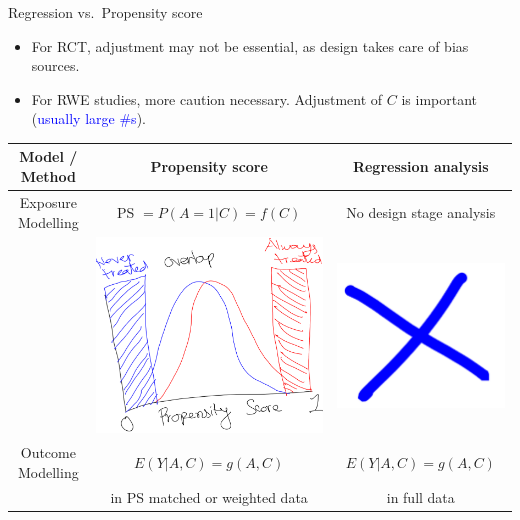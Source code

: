 \documentclass[
  ignorenonframetext,
  aspectratio=169]{beamer}
\providecommand{\tightlist}{%
  \setlength{\itemsep}{0pt}\setlength{\parskip}{0pt}}
\begin{document}
\begin{frame}{Regression vs.~Propensity score}
\protect\hypertarget{regression-vs.-propensity-score}{}
\begin{itemize}
\tightlist
\item
  For RCT, adjustment may not be essential, as design takes care of bias
  sources.
\item
  For RWE studies, more caution necessary. Adjustment of \(C\) is
  important (\textcolor{blue}{usually large $\#$s}).
\end{itemize}

\begin{center}
\begin{tabular}{ c c c }
 \toprule
 Model / Method & Propensity score & Regression analysis \\ 
 \midrule
 Exposure Modelling & PS $ = P(A=1|C) = f(C)$ & No design stage analysis \\  
 & \includegraphics[width=0.25\linewidth]{overlap.png}  &  \includegraphics[width=0.25\linewidth]{cross.png} \\
 Outcome Modelling & $E(Y|A,C) = g(A,C)$ & $E(Y|A,C) = g(A,C)$ \\    
 & in PS matched or weighted data & in full data \\    
 \bottomrule
\end{tabular}
\end{center}
\end{frame}
\end{document}
